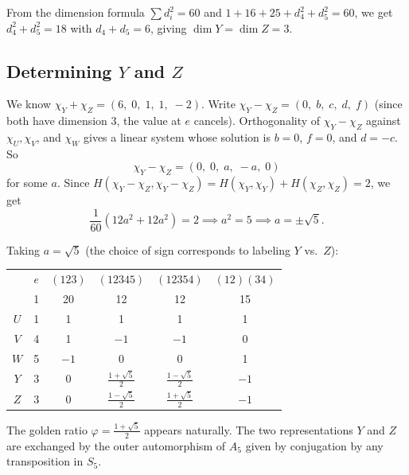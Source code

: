 \documentclass{report}
\begin{document}
From the dimension formula \(\sum d_i^2 = 60\) and \(1 + 16 + 25 + d_4^2 + d_5^2 = 60\), we get \(d_4^2 + d_5^2 = 18\) with \(d_4 + d_5 = 6\), giving \(\dim Y = \dim Z = 3\).

\subsection{Determining \(Y\) and \(Z\)}

We know \(\chi_Y + \chi_Z = (6,\; 0,\; 1,\; 1,\; -2)\). Write \(\chi_Y - \chi_Z = (0,\; b,\; c,\; d,\; f)\) (since both have dimension 3, the value at \(e\) cancels). Orthogonality of \(\chi_Y - \chi_Z\) against \(\chi_U, \chi_V\), and \(\chi_W\) gives a linear system whose solution is \(b = 0\), \(f = 0\), and \(d = -c\). So
\[\chi_Y - \chi_Z = (0,\; 0,\; a,\; -a,\; 0)\]
for some \(a\). Since \(H(\chi_Y - \chi_Z, \chi_Y - \chi_Z) = H(\chi_Y, \chi_Y) + H(\chi_Z, \chi_Z) = 2\), we get
\[\frac{1}{60}(12a^2 + 12a^2) = 2 \implies a^2 = 5 \implies a = \pm\sqrt{5}.\]

Taking \(a = \sqrt{5}\) (the choice of sign corresponds to labeling \(Y\) vs.\ \(Z\)):

\begin{center}
\begin{tabular}{c|ccccc}
& \(e\) & \((123)\) & \((12345)\) & \((12354)\) & \((12)(34)\) \\
& 1 & 20 & 12 & 12 & 15 \\ \hline
\(U\) & 1 & 1 & 1 & 1 & 1 \\
\(V\) & 4 & 1 & \(-1\) & \(-1\) & 0 \\
\(W\) & 5 & \(-1\) & 0 & 0 & 1 \\
\(Y\) & 3 & 0 & \(\frac{1+\sqrt{5}}{2}\) & \(\frac{1-\sqrt{5}}{2}\) & \(-1\) \\
\(Z\) & 3 & 0 & \(\frac{1-\sqrt{5}}{2}\) & \(\frac{1+\sqrt{5}}{2}\) & \(-1\)
\end{tabular}
\end{center}

The golden ratio \(\varphi = \frac{1 + \sqrt{5}}{2}\) appears naturally. The two representations \(Y\) and \(Z\) are exchanged by the outer automorphism of \(A_5\) given by conjugation by any transposition in \(S_5\).

\end{document}
